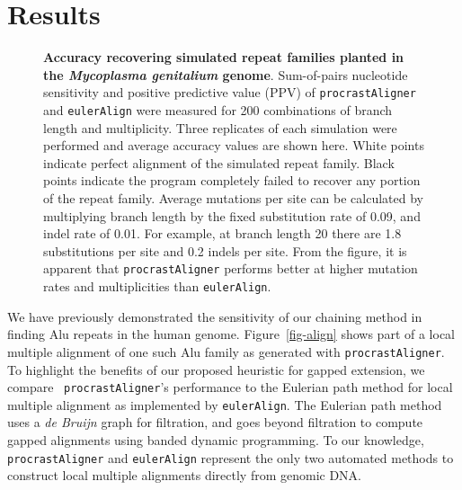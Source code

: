 \documentclass{llncs}
\begin{document}
\section{Results}
\begin{figure}[t]
\centering {}
\caption{\textbf{Accuracy recovering simulated repeat families planted in the
\textit{Mycoplasma genitalium} genome}.  Sum-of-pairs nucleotide
sensitivity and positive predictive value (PPV) of \texttt{procrastAligner}
and \texttt{eulerAlign} were measured for 200
combinations of branch length and multiplicity.  Three replicates of
each simulation were performed and average accuracy values are shown
here.  White points indicate perfect alignment of the simulated repeat
family.  Black points indicate the program completely failed to
recover any portion of the repeat family.  Average mutations per site can be
calculated by multiplying branch length by the fixed substitution rate
of 0.09, and indel rate of 0.01.  For example, at branch length 20
there are 1.8 substitutions per site and 0.2 indels per site.  From
the figure, it is apparent that \texttt{procrastAligner} performs better
at higher mutation rates and multiplicities than \texttt{eulerAlign}.}
\label{fig-results}\vspace{-0.2cm}
\end{figure}

We have previously demonstrated the sensitivity of our chaining method
in finding Alu repeats in the human
genome\cite{ref-procrast}. Figure~\ref{fig-align} shows part of a
local multiple alignment of one such Alu family as generated with
\texttt{procrastAligner}. To highlight the benefits of our proposed
heuristic for gapped extension, we compare ~\texttt{procrastAligner}'s
performance to the Eulerian path method for local multiple alignment
as implemented by \texttt{eulerAlign}\cite{ref-related1}. The Eulerian
path method uses a \textit{de Bruijn} graph for filtration, and goes
beyond filtration to compute gapped alignments using banded dynamic
programming.  To our knowledge, \texttt{procrastAligner} and
\texttt{eulerAlign} represent the only two automated methods to
construct local multiple alignments directly from genomic DNA.
\end{document}
